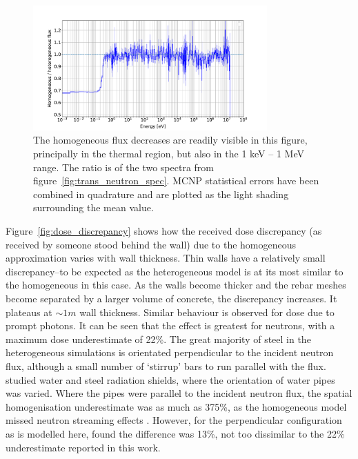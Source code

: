\begin{figure}[H]
  \centering
  \includegraphics[width=0.8\textwidth]{25HB200_800_relative_n_spectra}
  \caption{The homogeneous flux decreases are readily visible in this figure, principally in the thermal region, but also in the 1 keV -- 1 MeV range. The ratio is of the two spectra from figure~\ref{fig:trans_neutron_spec}. MCNP statistical errors have been combined in quadrature and are plotted as the light shading surrounding the mean value.}
  \label{fig:relative_neutron_spectra}
\end{figure}

Figure~\ref{fig:dose_discrepancy} shows how the received dose discrepancy (as received by someone stood behind the wall) due to the homogeneous approximation varies with wall thickness. Thin walls have a relatively small discrepancy--to be expected as the heterogeneous model is at its most similar to the homogeneous in this case. As the walls become thicker and the rebar meshes become separated by a larger volume of concrete, the discrepancy increases. It plateaus at $\sim 1m$ wall thickness. Similar behaviour is observed for dose due to prompt photons. It can be seen that the effect is greatest for neutrons, with a maximum dose underestimate of 22\%. The great majority of steel in the heterogeneous simulations is orientated perpendicular to the incident neutron flux, although a small number of `stirrup' bars to run parallel with the flux. \citeauthor{Pampin2007} studied water and steel radiation shields, where the orientation of water pipes was varied. Where the pipes were parallel to the incident neutron flux, the spatial homogenisation underestimate was as much as 375\%, as the homogeneous model missed neutron streaming effects \cite{Pampin2007}. However, for the perpendicular configuration as is modelled here, \citeauthor{Pampin2007} found the difference was 13\%, not too dissimilar to the 22\% underestimate reported in this work.

